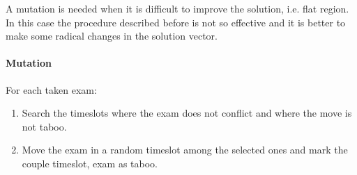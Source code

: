 A mutation is needed when it is difficult to improve the solution, i.e. flat region. In this case the procedure described before is not so effective and it is better to make some radical changes in the solution vector.
\paragraph*{Mutation}
For each taken exam:
\begin{enumerate}
\item Search the timeslots where the exam does not conflict and where the move is not taboo.
\item Move the exam in a random timeslot among the selected ones and mark the couple timeslot, exam as taboo.
\end{enumerate}